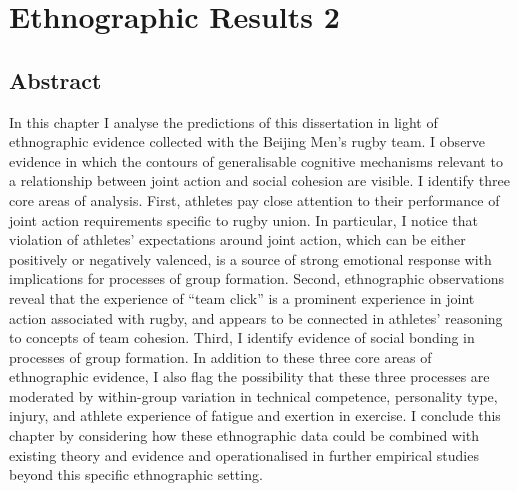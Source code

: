\chapter{\label{5ethnographicResults}Ethnographic Results 2}

\minitoc



\section{Abstract}
In this chapter I analyse the predictions of this dissertation in light of ethnographic evidence collected with the Beijing Men's rugby team.  I observe evidence in which the contours of generalisable cognitive mechanisms relevant to a relationship between joint action and social cohesion are visible.  I identify three core areas of analysis.  First, athletes pay close attention to their performance of joint action requirements specific to rugby union.  In particular, I notice that violation of athletes' expectations around joint action, which can be either positively or negatively valenced, is a source of strong emotional response with implications for processes of group formation.  Second, ethnographic observations reveal that the experience of ``team click'' is a prominent experience in joint action associated with rugby, and appears to be connected in athletes' reasoning to concepts of team cohesion.  Third, I identify evidence of social bonding in processes of group formation.  In addition to these three core areas of ethnographic evidence, I also flag the possibility that these three processes are moderated by within-group variation in technical competence, personality type, injury, and athlete experience of fatigue and exertion in exercise.  I conclude this chapter by considering how these ethnographic data could be combined with existing theory and evidence and operationalised in further empirical studies beyond this specific ethnographic setting.


